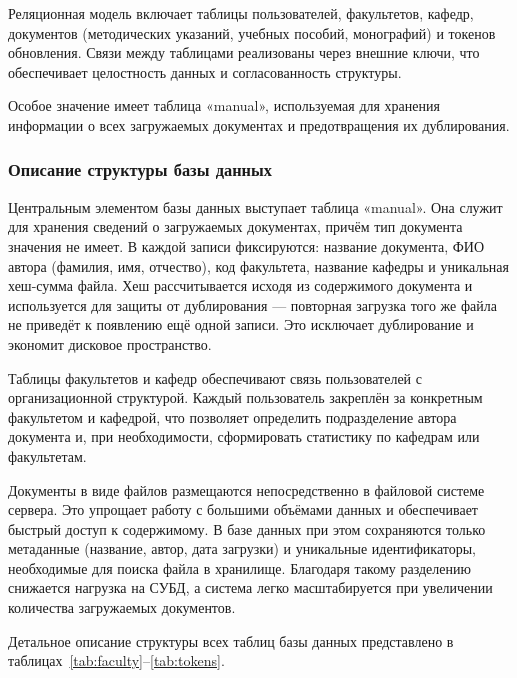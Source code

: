 Реляционная модель включает таблицы пользователей, факультетов, кафедр, документов (методических указаний, учебных пособий, монографий) и токенов обновления. Связи между таблицами реализованы через внешние ключи, что обеспечивает целостность данных и согласованность структуры.

Особое значение имеет таблица «manual», используемая для хранения информации о всех загружаемых документах и предотвращения их дублирования.

\subsubsection{Описание структуры базы данных}

Центральным элементом базы данных выступает таблица «manual». Она служит для хранения сведений о загружаемых документах, причём тип документа значения не имеет. В каждой записи фиксируются: название документа, ФИО автора (фамилия, имя, отчество), код факультета, название кафедры и уникальная хеш-сумма файла. Хеш рассчитывается исходя из содержимого документа и используется для защиты от дублирования — повторная загрузка того же файла не приведёт к появлению ещё одной записи. Это исключает дублирование и экономит дисковое пространство.

Таблицы факультетов и кафедр обеспечивают связь пользователей с организационной структурой. Каждый пользователь закреплён за конкретным факультетом и кафедрой, что позволяет определить подразделение автора документа и, при необходимости, сформировать статистику по кафедрам или факультетам.

Документы в виде файлов размещаются непосредственно в файловой системе сервера. Это упрощает работу с большими объёмами данных и обеспечивает быстрый доступ к содержимому. В базе данных при этом сохраняются только метаданные (название, автор, дата загрузки) и уникальные идентификаторы, необходимые для поиска файла в хранилище. Благодаря такому разделению снижается нагрузка на СУБД, а система легко масштабируется при увеличении количества загружаемых документов.

Детальное описание структуры всех таблиц базы данных представлено в таблицах~\ref{tab:faculty}--\ref{tab:tokens}.

